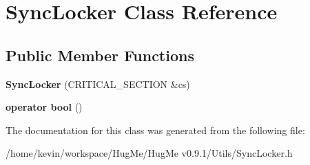 \hypertarget{classSyncLocker}{
\section{SyncLocker Class Reference}
\label{classSyncLocker}
}
\subsection*{Public Member Functions}
\begin{DoxyCompactItemize}
\item 
\hypertarget{classSyncLocker_a70e00872c7846340907f66e1f731ad51}{
{\bfseries SyncLocker} (CRITICAL\_\-SECTION \&cs)}
\label{classSyncLocker_a70e00872c7846340907f66e1f731ad51}

\item 
\hypertarget{classSyncLocker_a8e127b12629478b4acb1d511f9514bb6}{
{\bfseries operator bool} ()}
\label{classSyncLocker_a8e127b12629478b4acb1d511f9514bb6}

\end{DoxyCompactItemize}


The documentation for this class was generated from the following file:\begin{DoxyCompactItemize}
\item 
/home/kevin/workspace/HugMe/HugMe v0.9.1/Utils/SyncLocker.h\end{DoxyCompactItemize}
